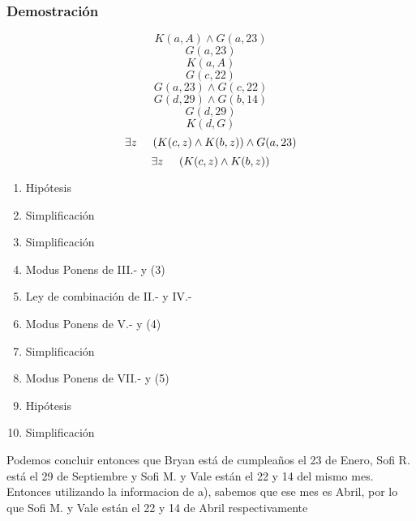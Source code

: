 \documentclass[letterpaper,10pt]{article}
\begin{document}
\subsubsection*{Demostraci\'on}
\begin{minipage}[c]{0.4\textwidth}
\begin{equation*}
    K(a,A) \wedge G(a,23)
\end{equation*}
\begin{equation*}
    G(a,23)
\end{equation*}
\begin{equation*}
    K(a,A)
\end{equation*}
\begin{equation*}
    G(c,22)
\end{equation*}
\begin{equation*}
    G(a,23) \wedge G(c,22)
\end{equation*}
\begin{equation*}
    G(d,29) \wedge G(b,14)
\end{equation*}
\begin{equation*}
    G(d,29)
\end{equation*}
\begin{equation*}
    K(d,G)
\end{equation*}
\begin{equation*}
    \exists z \hspace{5mm} (K(c,z) \wedge K(b,z)) \wedge G(a,23)
\end{equation*}
\begin{equation*}
    \exists z \hspace{5mm} (K(c,z) \wedge K(b,z))
\end{equation*}
\end{minipage}
\begin{minipage}[c]{0.5\textwidth}
\begin{enumerate}[I{.-}]
    \item Hip\'otesis
    \item Simplificaci\'on
    \item Simplificaci\'on
    \item Modus Ponens de III.- y (3)
    \item Ley de combinaci\'on de II.- y IV.-
    \item Modus Ponens de V.- y (4)
    \item Simplificaci\'on
    \item Modus Ponens de VII.- y (5)
    \item Hip\'otesis
    \item Simplificaci\'on
\end{enumerate}
\end{minipage}
\vspace{0.5cm}
\newline
Podemos concluir entonces que Bryan est\'a de cumpleaños el 23 de Enero, Sofi R. est\'a el 29 de Septiembre y Sofi M. y Vale est\'an el 22 y 14 del mismo mes. Entonces utilizando la informacion de a), sabemos que ese mes es Abril, por lo que Sofi M. y Vale est\'an el 22 y 14 de Abril respectivamente
\end{document}
